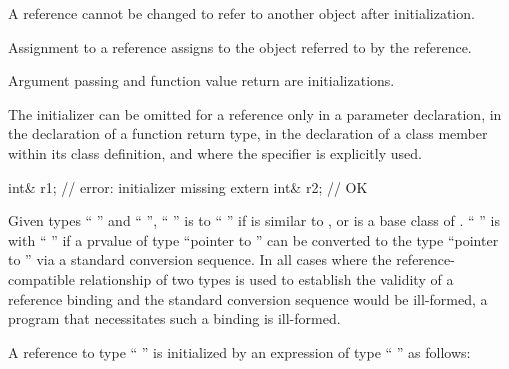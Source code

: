 \pnum
A reference cannot be changed to refer to another object after initialization.
%
\begin{note}
Assignment to a reference assigns to the object referred to by the reference.
\end{note}
%
Argument passing
%
and function value return are initializations.

\pnum
The initializer can be omitted for a reference only in a parameter declaration,
in the declaration of a function return type, in the declaration of
a class member within its class definition, and where the
specifier is explicitly used.
%
\begin{example}
\begin{codeblock}
int& r1;                        // error: initializer missing
extern int& r2;                 // OK
\end{codeblock}
\end{example}

\pnum
Given types `` '' and `` '',
`` '' is  to
`` '' if
 is similar to , or
 is a base class of .
`` '' is 
with `` '' if
a prvalue of type ``pointer to  '' can be converted to
the type ``pointer to  ''
via a standard conversion sequence.
In all cases where the reference-compatible relationship
of two types is used to establish the validity of a reference binding and
the standard conversion sequence would be ill-formed,
a program that necessitates such a binding is ill-formed.

\pnum
A reference to type `` '' is initialized by
an expression of type `` '' as follows:%

